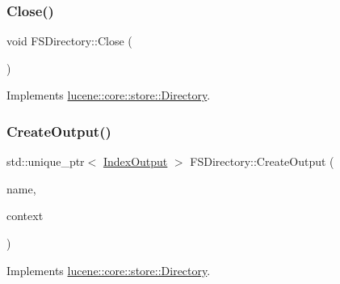 \subsubsection{\texorpdfstring{Close()}{Close()}}
{\footnotesize\ttfamily void F\+S\+Directory\+::\+Close (\begin{DoxyParamCaption}{ }\end{DoxyParamCaption})\hspace{0.3cm}{\ttfamily [virtual]}}



Implements \mbox{\hyperlink{classlucene_1_1core_1_1store_1_1Directory_aa803c099bd4963d2ed83dbe10152d909}{lucene\+::core\+::store\+::\+Directory}}.

\mbox{\label{classlucene_1_1core_1_1store_1_1FSDirectory_a4d1e13c1fd5b956a2e063b954915bd2c}} 
\subsubsection{\texorpdfstring{Create\+Output()}{CreateOutput()}}
{\footnotesize\ttfamily std\+::unique\+\_\+ptr$<$ \mbox{\hyperlink{classlucene_1_1core_1_1store_1_1IndexOutput}{Index\+Output}} $>$ F\+S\+Directory\+::\+Create\+Output (\begin{DoxyParamCaption}\item[{\mbox{\hyperlink{ZlibCrc32_8h_a2c212835823e3c54a8ab6d95c652660e}{const}} std\+::string \&}]{name,  }\item[{\mbox{\hyperlink{ZlibCrc32_8h_a2c212835823e3c54a8ab6d95c652660e}{const}} \mbox{\hyperlink{classlucene_1_1core_1_1store_1_1IOContext}{I\+O\+Context}} \&}]{context }\end{DoxyParamCaption})\hspace{0.3cm}{\ttfamily [virtual]}}



Implements \mbox{\hyperlink{classlucene_1_1core_1_1store_1_1Directory_aae10f6510f3bfb7e561fc438d4419e4a}{lucene\+::core\+::store\+::\+Directory}}.

\mbox{\label{classlucene_1_1core_1_1store_1_1FSDirectory_a488eb837cbe2d5a46363e57c314def3a}} 
